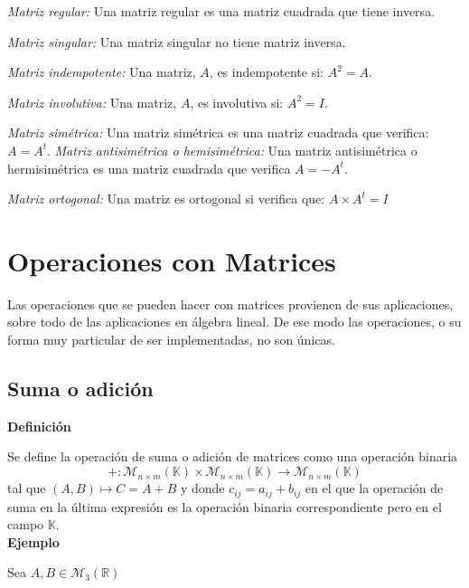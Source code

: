 \documentclass[10pt]{article}
\begin{document}
\begin{itemize}
\textit{Matriz regular:} Una matriz  regular es una matriz cuadrada que tiene inversa.

\textit{Matriz singular:} Una matriz  singular no tiene matriz inversa.

\textit{Matriz indempotente:} Una matriz, $A$, es indempotente si: $A^2 = A$.

\textit{Matriz involutiva:} Una matriz, $A$, es involutiva si: $A^2 = I$.

\textit{Matriz simétrica:} Una matriz simétrica es una matriz cuadrada que verifica: $A = A^t$.
\textit{Matriz antisimétrica o hemisimétrica:} Una matriz antisimétrica o hermisimétrica es una matriz cuadrada que verifica $A = -A^t$.

\textit{Matriz ortogonal:} Una matriz es ortogonal si verifica que: $A\times {A^t} = I$

\end{itemize}

\section{Operaciones con Matrices}
Las operaciones que se pueden hacer con matrices provienen de sus aplicaciones, sobre todo de las aplicaciones en álgebra lineal. De ese modo las operaciones, o su forma muy particular de ser implementadas, no son únicas.

\subsection{Suma o adición}

\noindent \textbf{Definición}

Se define la operación de suma o adición de matrices como una operación binaria
$$
+ : \mathcal{M}_{n\times {m}}(\mathbb{K})\times {\mathcal{M}_{n\times {m}}(\mathbb{K})} \rightarrow \mathcal{M}_{n\times {m}}(\mathbb{K})
$$
tal que $(A, B) \longmapsto C = A+B$ y donde $c_{ij} = a_{ij} + b_{ij}$ en el que la operación de suma en la última expresión es la operación binaria correspondiente pero en el campo $\mathbb{K}$. \\

\noindent \textbf{Ejemplo}

Sea $A, B \in \mathcal{M_3}(\mathbb{R})$
\end{document}
